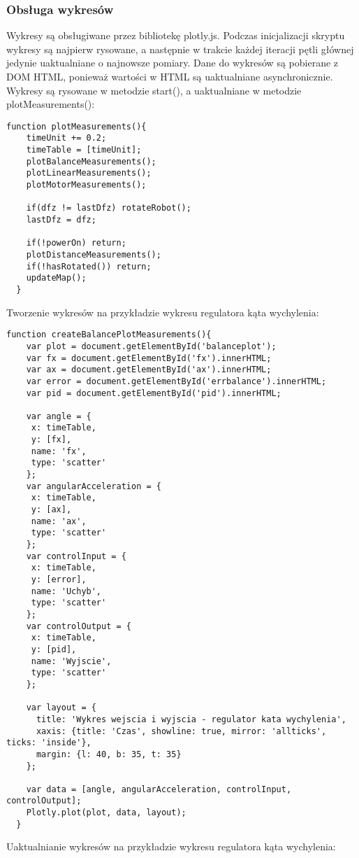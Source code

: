\documentclass[a4paper,12pt,twoside,openany]{report}
\begin{document}
\subsubsection{Obsługa wykresów}

Wykresy są obsługiwane przez bibliotekę plotly.js. Podczas inicjalizacji skryptu wykresy są najpierw rysowane, a następnie w trakcie każdej iteracji pętli głównej jedynie uaktualniane o najnowsze pomiary. Dane do wykresów są pobierane z DOM HTML, ponieważ wartości w HTML są uaktualniane asynchronicznie. Wykresy są rysowane w metodzie start(), a uaktualniane w metodzie plotMeasurements():
\begin{lstlisting}[style=customhtml]
  function plotMeasurements(){
	timeUnit += 0.2;
	timeTable = [timeUnit];
	plotBalanceMeasurements();
	plotLinearMeasurements();
	plotMotorMeasurements();
	
	if(dfz != lastDfz) rotateRobot();
	lastDfz = dfz;
	
	if(!powerOn) return;
	plotDistanceMeasurements();
	if(!hasRotated()) return;
	updateMap();
  }
\end{lstlisting}
Tworzenie wykresów na przykładzie wykresu regulatora kąta wychylenia:
\begin{lstlisting}[style=customhtml]
  function createBalancePlotMeasurements(){
    var plot = document.getElementById('balanceplot');
    var fx = document.getElementById('fx').innerHTML;
    var ax = document.getElementById('ax').innerHTML;
    var error = document.getElementById('errbalance').innerHTML;
    var pid = document.getElementById('pid').innerHTML;
	
    var angle = {
     x: timeTable,
     y: [fx],
     name: 'fx',
     type: 'scatter'
    };
    var angularAcceleration = {
     x: timeTable,
     y: [ax],
     name: 'ax',
     type: 'scatter'
    };
    var controlInput = {
     x: timeTable,
     y: [error],
     name: 'Uchyb',
     type: 'scatter'
    };
    var controlOutput = {
     x: timeTable,
     y: [pid],
     name: 'Wyjscie',
     type: 'scatter'
    };
	
    var layout = {
      title: 'Wykres wejscia i wyjscia - regulator kata wychylenia',
      xaxis: {title: 'Czas', showline: true, mirror: 'allticks', ticks: 'inside'},
      margin: {l: 40, b: 35, t: 35}
    };
	
    var data = [angle, angularAcceleration, controlInput, controlOutput];
    Plotly.plot(plot, data, layout);
  }
\end{lstlisting}
Uaktualnianie wykresów na przykładzie wykresu regulatora kąta wychylenia:
\end{document}

